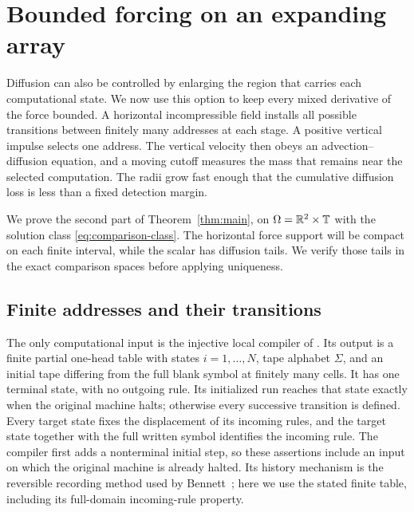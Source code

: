 \section{Bounded forcing on an expanding array}
\label{sec:bounded}\label{cbe:section}

Diffusion can also be controlled by enlarging the region that carries
each computational state.  We now use this option to keep every mixed
derivative of the force bounded.  A horizontal incompressible field
installs all possible transitions between finitely many addresses at
each stage.  A positive vertical impulse selects one address.  The
vertical velocity then obeys an advection--diffusion equation, and a
moving cutoff measures the mass that remains near the selected
computation.  The radii grow fast enough that the cumulative diffusion
loss is less than a fixed detection margin.

We prove the second part of Theorem~\ref{thm:main}, on
$\Omega=\mathbb R^2\times\mathbb T$ with the solution class
\eqref{eq:comparison-class}. The horizontal force support will be
compact on each finite interval, while the scalar has diffusion tails.
We verify those tails in the exact comparison spaces before applying
uniqueness.

\subsection{Finite addresses and their transitions}
\label{cbe:addresses}

The only computational input is the injective local compiler of
\cite[Lemma~3.1]{stationary2026}.  Its output is
a finite partial one-head table with states $i=1,\ldots,N$, tape
alphabet $\Sigma$, and an initial tape differing from the full blank
symbol at finitely many cells.  It has one terminal state, with no outgoing rule.
Its initialized run reaches that state exactly when the original
machine halts; otherwise every successive transition is defined.
Every target state fixes the displacement of its incoming rules, and
the target state together with the full written symbol identifies
the incoming rule.  The compiler first adds a nonterminal initial
step, so these assertions include an input on which the original
machine is already halted.  Its history mechanism is the reversible
recording method used by Bennett~\cite{Bennett1973}; here we use
the stated finite table, including its full-domain incoming-rule
property.

